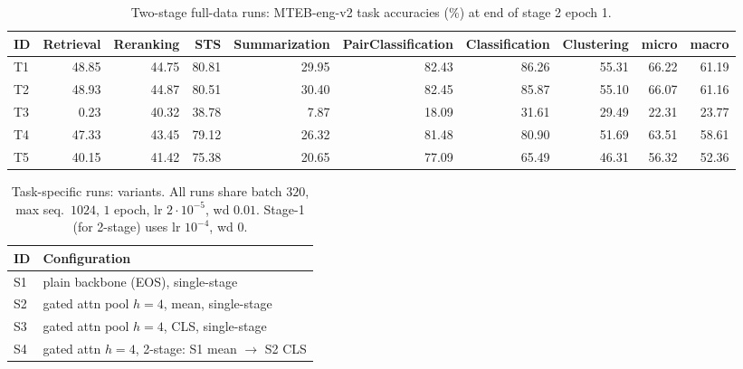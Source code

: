 \documentclass{article}
\begin{document}
\begin{table}[ht]
\centering
\small
\setlength{\tabcolsep}{4pt}
\caption{Two-stage full-data runs: MTEB-eng-v2 task accuracies (\%) at end of stage 2 epoch 1.}
\label{tab:s2-perf}
\begin{tabular}{lrrrrrrrrr}
\toprule
ID & Retrieval & Reranking & STS & Summarization & PairClassification & Classification & Clustering & micro & macro \\
\midrule
T1 & 48.85 & 44.75 & 80.81 & 29.95 & 82.43 & 86.26 & 55.31 & 66.22 & 61.19 \\
T2 & 48.93 & 44.87 & 80.51 & 30.40 & 82.45 & 85.87 & 55.10 & 66.07 & 61.16 \\
T3 & 0.23 & 40.32 & 38.78 & 7.87 & 18.09 & 31.61 & 29.49 & 22.31 & 23.77 \\
T4 & 47.33 & 43.45 & 79.12 & 26.32 & 81.48 & 80.90 & 51.69 & 63.51 & 58.61 \\
T5 & 40.15 & 41.42 & 75.38 & 20.65 & 77.09 & 65.49 & 46.31 & 56.32 & 52.36 \\
\bottomrule
\end{tabular}
\end{table}



\begin{table}[ht]
\centering
\small
\setlength{\tabcolsep}{4pt}
\caption{Task-specific runs: variants. All runs share batch $320$, max seq.\ $1024$, $1$ epoch, lr $2{\cdot}10^{-5}$, wd $0.01$. Stage-1 (for 2-stage) uses lr $10^{-4}$, wd $0$.}
\label{tab:ts-hparams}
\begin{tabular}{ll}
\toprule
ID & Configuration \\
\midrule
S1 & plain backbone (EOS), single-stage \\
S2 & gated attn pool $h{=}4$, mean, single-stage \\
S3 & gated attn pool $h{=}4$, CLS, single-stage \\
S4 & gated attn $h{=}4$, 2-stage: S1 mean $\to$ S2 CLS \\
\bottomrule
\end{tabular}
\end{table}
\end{document}
